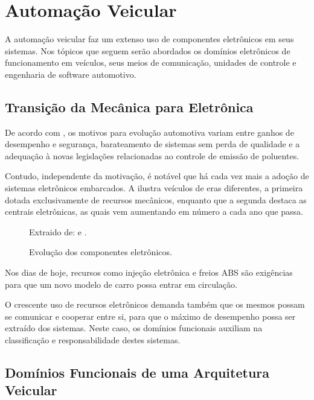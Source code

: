 \chapter{Automação Veicular}
\label{cap:automacao_veicular}

A automação veicular faz um extenso uso de componentes eletrônicos em seus sistemas. Nos tópicos que seguem serão abordados os domínios eletrônicos de funcionamento em veículos, seus meios de comunicação, unidades de controle e engenharia de software automotivo.

\section{Transição da Mecânica para Eletrônica}

De acordo com , os motivos para evolução automotiva variam entre ganhos de desempenho e segurança, barateamento de sistemas sem perda de qualidade e a adequação à novas legislações relacionadas ao controle de emissão de poluentes.

Contudo, independente da motivação, é notável que há cada vez mais a adoção de sistemas eletrônicos embarcados. A  ilustra veículos de eras diferentes, a primeira dotada exclusivamente de recursos mecânicos, enquanto que a segunda destaca as centrais eletrônicas, as quais vem aumentando em número a cada ano que passa.

\begin{figure}[htb]
	\centering
	\caption{Evolução dos componentes eletrônicos.}
	Extraido de:  e .
	\label{fig:cap2_car_evolution}
\end{figure}

Nos dias de hoje, recursos como injeção eletrônica e freios ABS são exigências para que um novo modelo de carro possa entrar em circulação.

O crescente uso de recursos eletrônicos demanda também que os mesmos possam se comunicar e cooperar entre si, para que o máximo de desempenho possa ser extraído dos sistemas. Neste caso, os domínios funcionais auxiliam na classificação e responsabilidade destes sistemas.

\section{Domínios Funcionais de uma Arquitetura Veicular}

